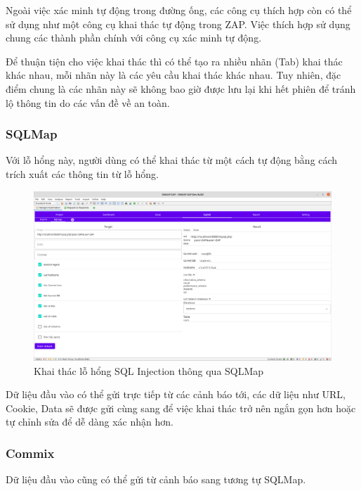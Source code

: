 \documentclass[./../main.tex]{subfiles}
\begin{document}
Ngoài việc xác minh tự động trong đường ống, các công cụ thích
hợp còn có thể sử dụng như một công cụ khai thác tự động trong ZAP.
Việc thích hợp sử dụng chung các thành phần chính với công cụ xác minh
tự động.

Để thuận tiện cho việc khai thác thì có thể tạo ra nhiều nhãn (Tab)
khai thác khác nhau, mỗi nhãn này là các yêu cầu khai thác khác nhau.
Tuy nhiên, đặc điểm chung là các nhãn này sẽ không bao giờ được lưu lại
khi hết phiên để tránh lộ thông tin do các vấn đề về an toàn.
\subsubsection{SQLMap}
Với lỗ hổng này, người dùng có thể khai thác từ một cách tự động
bằng cách trích xuất các thông tin từ lỗ hổng.

\begin{figure}[H]
	\includegraphics[width=\linewidth]{./images/sqlmap_explot.png}
	\caption{Khai thác lỗ hổng SQL Injection thông qua SQLMap}
	\label{fig:sqlmap_explot}
\end{figure}
Dữ liệu đầu vào có thể gửi trực tiếp từ các cảnh báo tới, các dữ
liệu như URL, Cookie, Data sẽ được gửi cùng sang để việc khai thác
trở nên ngắn gọn hơn hoặc tự chỉnh sửa để dễ dàng xác nhận hơn.
\subsubsection{Commix}

Dữ liệu đầu vào cũng có thể gửi từ cảnh báo sang tương tự SQLMap.
\end{document}
